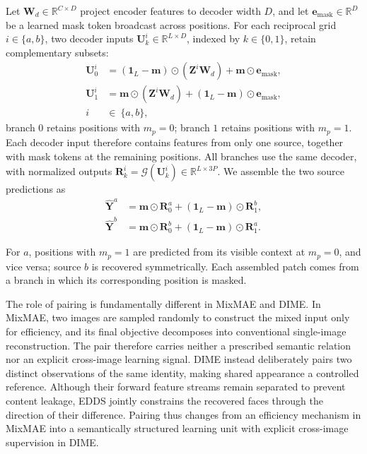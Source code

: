 \documentclass[10pt,journal,compsoc]{IEEEtran}
\begin{document}
Let $\mathbf{W}_{d}\in\mathbb{R}^{C\times D}$ project encoder features to decoder width $D$, and let $\mathbf{e}_{\mathrm{mask}}\in\mathbb{R}^{D}$ be a learned mask token broadcast across positions. For each reciprocal grid $i\in\{a,b\}$, two decoder inputs $\mathbf{U}^{i}_{k}\in\mathbb{R}^{L\times D}$, indexed by $k\in\{0,1\}$, retain complementary subsets:
\begin{equation}
\begin{aligned}
\mathbf{U}^{i}_{0}
&=
(\mathbf{1}_{L}-\mathbf{m})\odot(\mathbf{Z}^{i}\mathbf{W}_{d})
+
\mathbf{m}\odot\mathbf{e}_{\mathrm{mask}},\\
\mathbf{U}^{i}_{1}
&=
\mathbf{m}\odot(\mathbf{Z}^{i}\mathbf{W}_{d})
+
(\mathbf{1}_{L}-\mathbf{m})\odot\mathbf{e}_{\mathrm{mask}},\\
i\ &\in\ \{a,b\},
\end{aligned}
\label{eq:dime_complementary_decoder_inputs}
\end{equation}
branch $0$ retains positions with $m_p=0$; branch $1$ retains positions with $m_p=1$. Each decoder input therefore contains features from only one source, together with mask tokens at the remaining positions. All branches use the same decoder, with normalized outputs $\mathbf{R}^{i}_{k}=\mathcal{G}(\mathbf{U}^{i}_{k})\in\mathbb{R}^{L\times 3P}$. We assemble the two source predictions as
\begin{equation}
\begin{aligned}
\hat{\mathbf{Y}}^{a}
&=
\mathbf{m}\odot\mathbf{R}^{a}_{0}
+
(\mathbf{1}_{L}-\mathbf{m})\odot\mathbf{R}^{b}_{1},\\
\hat{\mathbf{Y}}^{b}
&=
\mathbf{m}\odot\mathbf{R}^{b}_{0}
+
(\mathbf{1}_{L}-\mathbf{m})\odot\mathbf{R}^{a}_{1}.
\end{aligned}
\label{eq:dime_complementary_unmixing}
\end{equation}

For $a$, positions with $m_p=1$ are predicted from its visible context at $m_p=0$, and vice versa; source $b$ is recovered symmetrically. Each assembled patch comes from a branch in which its corresponding position is masked.

The role of pairing is fundamentally different in MixMAE \cite{liu2023mixmae} and DIME. In MixMAE, two images are sampled randomly to construct the mixed input only for efficiency, and its final objective decomposes into conventional single-image reconstruction. The pair therefore carries neither a prescribed semantic relation nor an explicit cross-image learning signal. DIME instead deliberately pairs two distinct observations of the same identity, making shared appearance a controlled reference. Although their forward feature streams remain separated to prevent content leakage, EDDS jointly constrains the recovered faces through the direction of their difference. Pairing thus changes from an efficiency mechanism in MixMAE into a semantically structured learning unit with explicit cross-image supervision in DIME.
\end{document}
